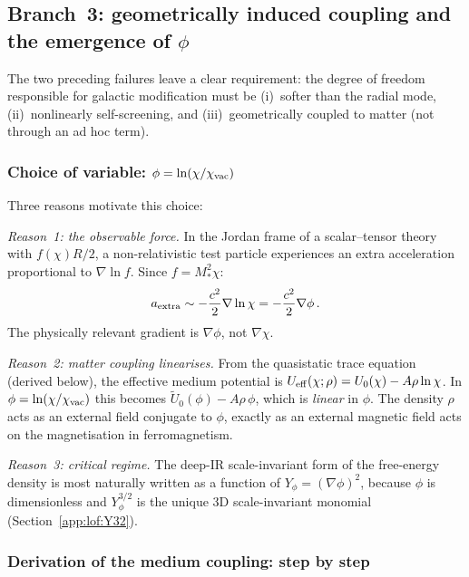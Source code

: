\documentclass[11pt,a4paper]{article}
\numberwithin{equation}{section}
\begin{document}
\subsection{Branch~3: geometrically induced coupling and the
emergence of $\phi$}
\label{app:lof:branch3}

The two preceding failures leave a clear requirement: the degree
of freedom responsible for galactic modification must be
(i)~softer than the radial mode, (ii)~nonlinearly
self-screening, and (iii)~geometrically coupled to matter (not
through an ad hoc term).

\subsubsection{Choice of variable: $\phi = \ln(\chi/\chi_{\rm vac})$}

Three reasons motivate this choice:

\emph{Reason~1: the observable force.} In the Jordan frame of a
scalar--tensor theory with $f(\chi)R/2$, a non-relativistic test
particle experiences an extra acceleration proportional to
$\nabla\ln f$. Since $f = M_*^2\chi$:
\begin{equation}
a_{\rm extra}
\sim -\frac{c^2}{2}\nabla\ln\chi
= -\frac{c^2}{2}\nabla\phi\,.
\label{eq:app_force_phi}
\end{equation}
The physically relevant gradient is $\nabla\phi$, not
$\nabla\chi$.

\emph{Reason~2: matter coupling linearises.} From the
quasistatic trace equation (derived below), the effective
medium potential is
$U_{\rm eff}(\chi;\rho) = U_0(\chi) - A\rho\ln\chi$.
In $\phi = \ln(\chi/\chi_{\rm vac})$ this becomes
$\tilde{U}_0(\phi) - A\rho\,\phi$, which is \emph{linear}
in $\phi$. The density $\rho$ acts as an external field
conjugate to $\phi$, exactly as an external magnetic field acts
on the magnetisation in ferromagnetism.

\emph{Reason~3: critical regime.} The deep-IR scale-invariant
form of the free-energy density is most naturally written as a
function of $Y_\phi = (\nabla\phi)^2$, because $\phi$ is
dimensionless and $Y_\phi^{3/2}$ is the unique 3D
scale-invariant monomial
(Section~\ref{app:lof:Y32}).

\subsubsection{Derivation of the medium coupling: step by step}
\label{app:lof:medium_coupling}
\end{document}
